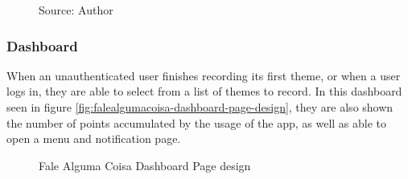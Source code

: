 \begin{figure}[ht]
    \caption*{Source: Author}
    \label{fig:falealgumacoisa-tos-page-design}
\end{figure}

\subsubsection{Dashboard}

When an unauthenticated user finishes recording its first theme, or when a user logs in, they are able to select from a list of themes to record. In this dashboard seen in figure \ref{fig:falealgumacoisa-dashboard-page-design}, they are also shown the number of points accumulated by the usage of the app, as well as able to open a menu and notification page.

\begin{figure}[ht]
    \centering
    \caption{Fale Alguma Coisa Dashboard Page design}

\end{figure}
